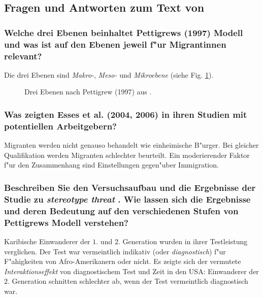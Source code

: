 \subsection{Fragen und Antworten zum Text von \textcite{deaux_nation_2006}}
\subsubsection{Welche drei Ebenen beinhaltet Pettigrews (1997) Modell und was ist auf den Ebenen jeweil f"ur Migrantinnen relevant?}
Die drei Ebenen sind \emph{Makro-}, \emph{Meso-} und \emph{Mikroebene} (siehe Fig. \ref{fig:deaux1}).

\begin{figure}[hb!]
        \begin{center}
        \end{center}
        \caption{Drei Ebenen nach Pettigrew (1997) aus \textcite{deaux_nation_2006}.}
        \label{fig:deaux1}
\end{figure}

\subsubsection{Was zeigten Esses et al. (2004, 2006) in ihren Studien mit potentiellen Arbeitgebern?}
Migranten werden nicht genauso behandelt wie einheimische B"urger. Bei gleicher Qualifikation werden Migranten schlechter beurteilt. Ein moderierender Faktor f"ur den Zusammenhang sind Einstellungen gegen"uber Immigration.

\subsubsection{Beschreiben Sie den Versuchsaufbau und die Ergebnisse der Studie zu \emph{stereotype threat} \parencite{deaux_nation_2006}. Wie lassen sich die Ergebnisse und deren Bedeutung auf den verschiedenen Stufen von Pettigrews Modell verstehen?}
Karibische Einwanderer der $1.$ und $2.$ Generation wurden in ihrer Testleistung verglichen. Der Test war vermeintlich indikativ (oder \emph{diagnostisch}) f"ur F"ahigkeiten von Afro-Amerikanern oder nicht. Es zeigte sich der vermutete \emph{Interaktionseffekt} von diagnostischem Test und Zeit in den USA: Einwanderer der $2.$ Generation schnitten schlechter ab, wenn der Test vermeintlich diagnostisch war.\\

